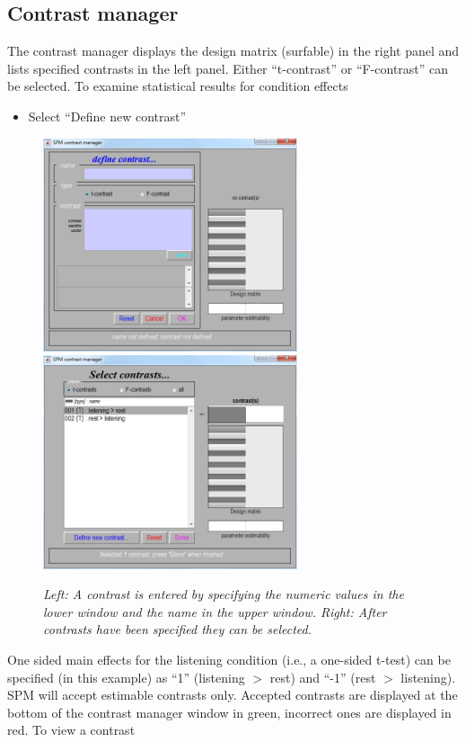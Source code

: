 \subsection{Contrast manager}

The contrast manager displays the design matrix (surfable) in the right panel and lists specified contrasts in the left panel. Either ``t-contrast'' or ``F-contrast'' can be selected. To examine statistical results for condition effects

\begin{itemize}
\item{Select ``Define new contrast''}
\end{itemize}
\begin{figure}
\includegraphics[width=75mm]{auditory/con_man2}
\includegraphics[width=75mm]{auditory/con_man3}
\caption{\emph{Left: A contrast is entered by specifying the numeric values in the lower window and the name in the upper window. Right: After contrasts have been specified they can be selected.}}
\end{figure}

One sided main effects for the listening condition (i.e., a one-sided t-test) can be specified (in this example) as ``1'' (listening $>$ rest) and ``-1'' (rest $>$ listening). SPM will accept estimable contrasts only. Accepted contrasts are displayed at the bottom of the contrast manager window in green, incorrect ones are displayed in red. To view a contrast

